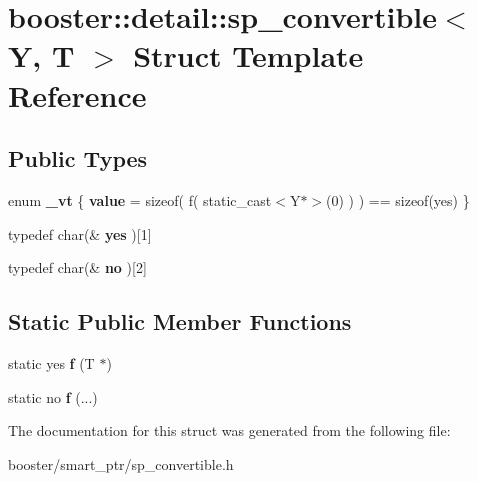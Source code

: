 \section{booster\-:\-:detail\-:\-:sp\-\_\-convertible$<$ Y, T $>$ Struct Template Reference}
\label{structbooster_1_1detail_1_1sp__convertible}
\subsection*{Public Types}
\begin{DoxyCompactItemize}
\item 
enum {\bfseries \-\_\-vt} \{ {\bfseries value} = sizeof( f( static\-\_\-cast$<$Y$\ast$$>$(0) ) ) == sizeof(yes)
 \}
\item 
typedef char(\& {\bfseries yes} )[1]\label{structbooster_1_1detail_1_1sp__convertible_abf5d3f8771631a523e49fa22b835c1d1}

\item 
typedef char(\& {\bfseries no} )[2]\label{structbooster_1_1detail_1_1sp__convertible_abe647cfa9f7eedbf8a48bd3885459808}

\end{DoxyCompactItemize}
\subsection*{Static Public Member Functions}
\begin{DoxyCompactItemize}
\item 
static yes {\bfseries f} (T $\ast$)\label{structbooster_1_1detail_1_1sp__convertible_a42352ce32a2cba6574f8422e875bce15}

\item 
static no {\bfseries f} (...)\label{structbooster_1_1detail_1_1sp__convertible_a87c0d2328ecc1cee456147ab904d2328}

\end{DoxyCompactItemize}


The documentation for this struct was generated from the following file\-:\begin{DoxyCompactItemize}
\item 
booster/smart\-\_\-ptr/sp\-\_\-convertible.\-h\end{DoxyCompactItemize}
